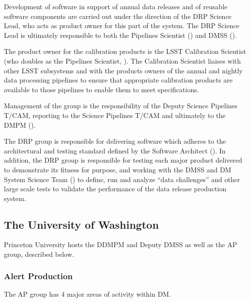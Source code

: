 Development of software in support of annual data releases and of reusable software components are carried out under the direction of the \gls{DRP} Science Lead, who acts as product owner for this part of the system.
The \gls{DRP} Science Lead is ultimately responsible to both the Pipelines Scientist () and \gls{DMSS} ().

The product owner for the \gls{calibration} products is the \gls{LSST} \gls{Calibration Scientist} (who doubles as the Pipelines Scientist, ).
The \gls{Calibration Scientist} liaises with other \gls{LSST} subsystems and with the products owners of the annual and nightly data processing pipelines to ensure that appropriate \gls{calibration} products are available to those pipelines to enable them to meet specifications.

Management of the group is the responsibility of the Deputy \gls{Science Pipelines} \gls{T/CAM}, reporting to the \gls{Science Pipelines} \gls{T/CAM} and ultimately to the \gls{DMPM} ().

The \gls{DRP} group is responsible for delivering software which adheres to the architectural and testing standard defined by the Software Architect ().
In addition, the \gls{DRP} group is responsible for testing each major product delivered to demonstrate its fitness for purpose, and working with the \gls{DMSS} and \gls{DM} System Science Team () to define, run and analyze ``data challenges'' and other large scale tests to validate the performance of the data release production system.

\subsection {The University of Washington\label{sect:uw}}

Princeton University hosts the \gls{DDMPM} and Deputy \gls{DMSS} as well as the \gls{AP} group, described below.

\subsubsection{Alert Production\label{sect:ap}}

The \gls{AP} group has 4 major areas of activity within \gls{DM}.

